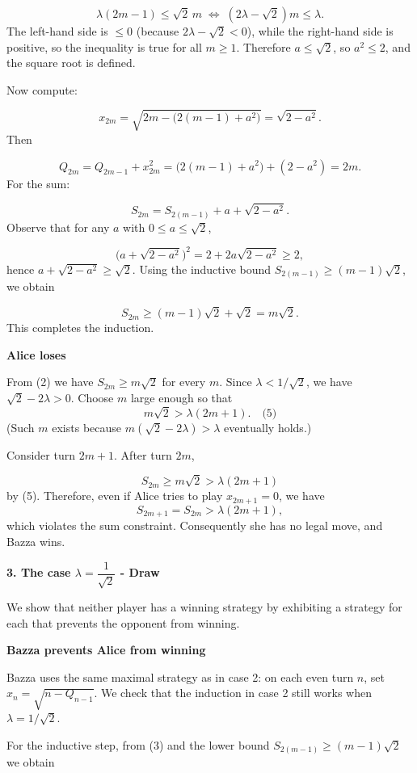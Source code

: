 \documentclass{llmxive}
\providecommand{\solutionheading}[1]{\par\smallskip\noindent\textbf{#1}\par}
\begin{document}
\[
\lambda(2m-1) \le \sqrt{2}\,m \;\Longleftrightarrow\; (2\lambda - \sqrt{2})m \le \lambda.
\]
The left-hand side is \(\le 0\) (because \(2\lambda - \sqrt{2} < 0\)), while the right-hand side is positive, so the inequality is true for all \(m\ge 1\). Therefore \(a \le \sqrt{2}\), so \(a^2 \le 2\), and the square root is defined.\par
Now compute:\par
\[
x_{2m} = \sqrt{2m - \bigl(2(m-1) + a^2\bigr)} = \sqrt{2 - a^2}.
\]
Then\par
\[
Q_{2m} = Q_{2m-1} + x_{2m}^2 = \bigl(2(m-1) + a^2\bigr) + (2 - a^2) = 2m.
\]
For the sum:\par
\[
S_{2m} = S_{2(m-1)} + a + \sqrt{2 - a^2}.
\]
Observe that for any \(a\) with \(0\le a\le \sqrt{2}\),\par
\[
\bigl(a + \sqrt{2 - a^2}\bigr)^2 = 2 + 2a\sqrt{2 - a^2} \ge 2,
\]
hence \(a + \sqrt{2 - a^2} \ge \sqrt{2}\). Using the inductive bound \(S_{2(m-1)} \ge (m-1)\sqrt{2}\), we obtain\par
\[
S_{2m} \ge (m-1)\sqrt{2} + \sqrt{2} = m\sqrt{2}.
\]
This completes the induction.\par
\solutionheading{Alice loses}
From (2) we have \(S_{2m} \ge m\sqrt{2}\) for every \(m\). Since \(\lambda < 1/\sqrt{2}\), we have \(\sqrt{2} - 2\lambda > 0\). Choose \(m\) large enough so that
\[
m\sqrt{2} > \lambda(2m+1). \quad\text{(5)}
\]
(Such \(m\) exists because \(m(\sqrt{2} - 2\lambda) > \lambda\) eventually holds.)\par
Consider turn \(2m+1\). After turn \(2m\),\par
\[
S_{2m} \ge m\sqrt{2} > \lambda(2m+1)
\]
by (5). Therefore, even if Alice tries to play \(x_{2m+1}=0\), we have
\[
S_{2m+1} = S_{2m} > \lambda(2m+1),
\]
which violates the sum constraint. Consequently she has no legal move, and Bazza wins.\par
\smallskip
\solutionheading{3. The case \(\lambda = \dfrac{1}{\sqrt{2}}\) - Draw}
We show that neither player has a winning strategy by exhibiting a strategy for each that prevents the opponent from winning.\par
\solutionheading{Bazza prevents Alice from winning}
Bazza uses the same maximal strategy as in case 2: on each even turn \(n\), set \(x_n = \sqrt{n - Q_{n-1}}\). We check that the induction in case 2 still works when \(\lambda = 1/\sqrt{2}\).\par
For the inductive step, from (3) and the lower bound \(S_{2(m-1)} \ge (m-1)\sqrt{2}\) we obtain\par
\end{document}
